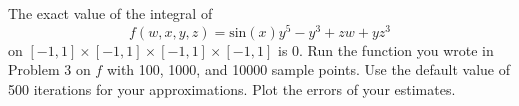 \begin{problem}
\begin{enumerate}
\end{enumerate}
\end{problem}

\begin{problem}
\label{prob:mc_test}
The exact value of the integral of
\[
f(w,x,y,z) = \text{sin}(x) y^5 -y^3 + zw + yz^3
\]
on $[-1,1]\times[-1,1]\times[-1,1]\times[-1,1]$ is 0.
Run the function  you wrote in Problem 3 on $f$ with 100, 1000, and 10000 sample points. Use the default value of 500 iterations for your approximations.
Plot the errors of your estimates.
\end{problem}

